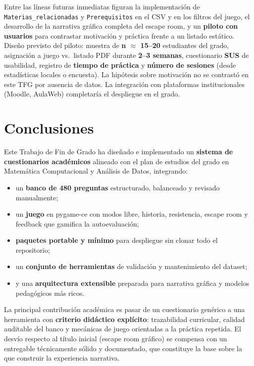\documentclass[11pt,a4paper]{article}
\begin{document}
Entre las líneas futuras inmediatas figuran la implementación de \texttt{Materias\_relacionadas} y \texttt{Prerequisitos} en el CSV y en los filtros del juego, el desarrollo de la narrativa gráfica completa del escape room, y un \textbf{piloto con usuarios} para contrastar motivación y práctica frente a un listado estático. Diseño previsto del piloto: muestra de \textbf{n $\approx$ 15--20} estudiantes del grado, asignación a juego vs.\ listado PDF durante \textbf{2--3 semanas}, cuestionario \textbf{SUS} de usabilidad, registro de \textbf{tiempo de práctica} y \textbf{número de sesiones} (desde estadísticas locales o encuesta). La hipótesis sobre motivación no se contrastó en este TFG por ausencia de datos. La integración con plataformas institucionales (Moodle, AulaWeb) completaría el despliegue en el grado.

\section{Conclusiones}

Este Trabajo de Fin de Grado ha diseñado e implementado un \textbf{sistema de cuestionarios académicos} alineado con el plan de estudios del grado en Matemática Computacional y Análisis de Datos, integrando:
\begin{itemize}
  \item un \textbf{banco de 480 preguntas} estructurado, balanceado y revisado manualmente;
  \item un \textbf{juego} en pygame-ce con modos libre, historia, resistencia, escape room y feedback que gamifica la autoevaluación;
  \item \textbf{paquetes portable y mínimo} para despliegue sin clonar todo el repositorio;
  \item un \textbf{conjunto de herramientas} de validación y mantenimiento del dataset;
  \item y una \textbf{arquitectura extensible} preparada para narrativa gráfica y modelos pedagógicos más ricos.
\end{itemize}

La principal contribución académica es pasar de un cuestionario genérico a una herramienta con \textbf{criterio didáctico explícito}: trazabilidad curricular, calidad auditable del banco y mecánicas de juego orientadas a la práctica repetida. El desvío respecto al título inicial (escape room gráfico) se compensa con un entregable técnicamente sólido y documentado, que constituye la base sobre la que construir la experiencia narrativa.
\end{document}
